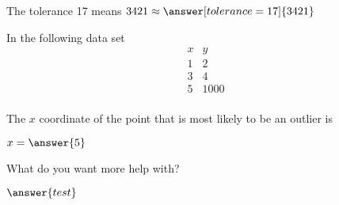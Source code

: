 \documentclass[handout, space]{ximera}
\begin{document}
\begin{problem}
   The tolerance 17 means $3421 \approx \answer[tolerance=17]{3421}$
\end{problem}

\begin{problem}
    In the following data set\\
\[\begin{array}{c|c}
    x&y\\
    \hline
    1&2\\
    3&4\\
    5&1000\\
\end{array}\]
    

    The $x$ coordinate of the point that is most likely to be an outlier is \begin{prompt} $x=\answer{5}$
\end{prompt}
\end{problem}

\begin{problem}
\begin{freeResponse}
What do you want more help with?\begin{prompt} $\answer{test}$\end{prompt}
\end{freeResponse}
\end{problem}
\end{document}
